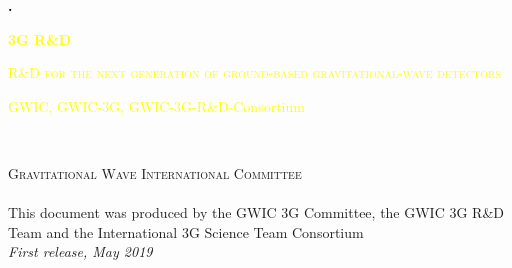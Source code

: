 
\begingroup
\thispagestyle{empty}

\centering
\par\normalfont\fontsize{1}{1}\sffamily\selectfont
\textcolor{black}{\textbf{.}}\\ %
\vspace{2.5cm}
\par\normalfont\fontsize{60}{60}\sffamily\selectfont
\textcolor{yellow}{\textbf{3G R\&D}}\\
\vskip6cm
\par\normalfont\fontsize{25}{25}\sffamily\selectfont
\textsc{\textcolor{yellow}{{R\&D for the next generation of ground-based gravitational-wave detectors}}}\par %
\vskip7.5cm
\textcolor{yellow}{\LARGE GWIC, GWIC-3G, GWIC-3G-R\&D-Consortium}\par %
\endgroup


\newpage
~\vfill
\thispagestyle{empty}


\noindent \textsc{Gravitational Wave International Committee}\\

\noindent \textsc{}\\ %

\noindent This document was produced by the GWIC 3G Committee, the GWIC 3G R\&D Team and the International 3G Science Team Consortium\\ %

\noindent \textit{First release, May 2019} %
\newpage


\pagestyle{empty} %
\tableofcontents %
\pagestyle{fancy} %
